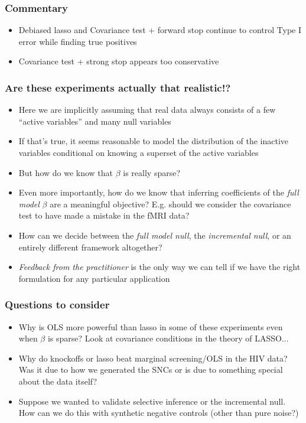 \documentclass{beamer}
\begin{document}
\begin{frame}
\frametitle{Commentary}
\begin{itemize}
\item Debiased lasso and Covariance test + forward stop continue to control Type I error while finding true positives
\item Covariance test + strong stop appears too conservative
\end{itemize}
\end{frame}


\begin{frame}
\frametitle{Are these experiments actually that realistic!?}
\begin{itemize}
\item<1-2> Here we are implicitly assuming that real data always consists of a few ``active variables'' and many null variables
\item<1-2> If that's true, it seems reasonable to model the distribution of the inactive variables conditional on knowing a superset of the active variables
\item<2> But how do we know that $\beta$ is really sparse?
\item<2> Even more importantly, how do we know that inferring coefficients of the
  \emph{full model} $\beta$ are a meaningful objective?  E.g. should we consider the
  covariance test to have made a mistake in the fMRI data?
\item<3-> How can we decide between the \emph{full model null}, the
  \emph{incremental null}, or an entirely different framework
  altogether?
\item<3-> \emph{Feedback from the practitioner} is the only way we can
  tell if we have the right formulation for any particular application
\end{itemize}
\end{frame}

\begin{frame}
\frametitle{Questions to consider}
\begin{itemize}
\item Why is OLS more powerful than lasso in some of these experiments even when $\beta$ is sparse? Look at covariance conditions in the theory of LASSO...
\item Why do knockoffs or lasso beat marginal screening/OLS in the HIV data? Was it due to how we generated the SNCs or is due to something special about the data itself?
\item Suppose we wanted to validate selective inference or the incremental null.  How can we do this with synthetic negative controls (other than pure noise?)
\end{itemize}
\end{frame}
\end{document}
